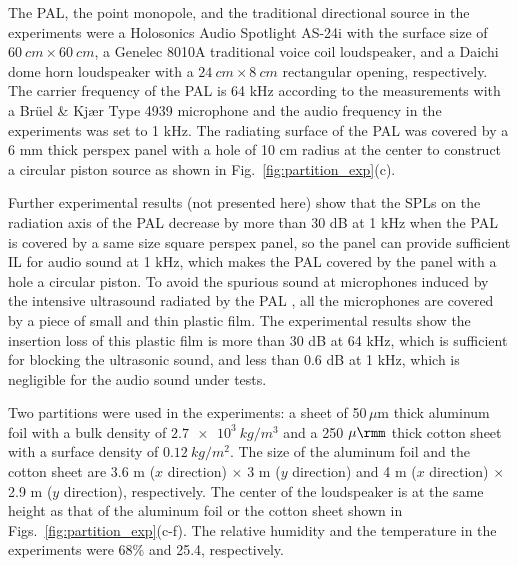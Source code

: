 The PAL, the point monopole, and the traditional directional source in the experiments were a Holosonics Audio Spotlight AS-24i with the surface size of $\SI{60 }{cm} \times \SI{ 60}{ cm}$, a Genelec 8010A traditional voice coil loudspeaker, and a Daichi dome horn loudspeaker with a $\SI{24 }{cm} \times\SI{ 8}{ cm}$ rectangular opening, respectively. 
The carrier frequency of the PAL is 64 kHz according to the measurements with a Brüel \& Kjær Type 4939 microphone and the audio frequency in the experiments was set to 1 kHz. 
The radiating surface of the PAL was covered by a 6 mm thick perspex panel with a hole of 10 cm radius at the center to construct a circular piston source as shown in Fig.~\ref{fig:partition_exp}(c). 

Further experimental results (not presented here) show that the SPLs on the radiation axis of the PAL decrease by more than 30 dB at 1 kHz when the PAL is covered by a same size square perspex panel, so the panel can provide sufficient IL for audio sound at 1 kHz, which makes the PAL covered by the panel with a hole a circular piston. 
To avoid the spurious sound at microphones induced by the intensive ultrasound radiated by the PAL \cite{Ji2019ExperimentalInvestigationParameters}, all the microphones are covered by a piece of small and thin plastic film. 
The experimental results  show the insertion loss of this plastic film is more than 30 dB at 64 kHz, which is sufficient for blocking the ultrasonic sound, and less than 0.6 dB at 1 kHz, which is negligible for the audio sound under tests.

Two partitions were used in the experiments: a sheet of 50\,$\mu$m thick aluminum foil with a bulk density of $\SI{2.7 e3} {kg/m^3}$ and a 250 $\mu\rmm$  thick cotton sheet with a surface density of $\SI{0.12}{kg/m^2}$. 
The size of the aluminum foil and the cotton sheet are 3.6 m ($x$ direction) $\times$ 3 m ($y$ direction) and 4 m ($x$ direction) $\times$ 2.9 m ($y$ direction), respectively. 
The center of the loudspeaker is at the same height as that of the aluminum foil or the cotton sheet shown in Figs.~\ref{fig:partition_exp}(c-f). 
The relative humidity and the temperature in the experiments were 68\% and 25.4\celsius, respectively. 

